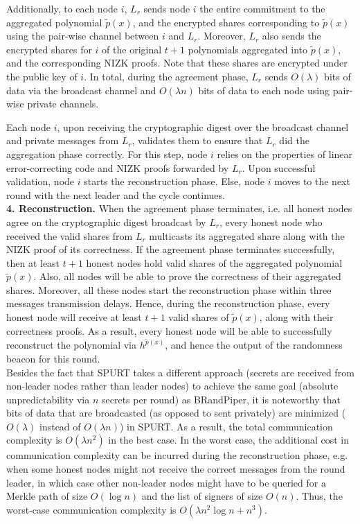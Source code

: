 \documentclass[11pt]{article}
\theoremstyle{definition}
\theoremstyle{remark}
\begin{document}
Additionally, to each node $i$, $L_r$ sends node $i$ the entire commitment to the aggregated polynomial $\tilde{p}(x)$, and the encrypted shares corresponding to $\tilde{p}(x)$ using the pair-wise channel between $i$ and $L_r$. Moreover, $L_r$ also sends the encrypted shares for $i$ of the original $t + 1$ polynomials aggregated into $\tilde{p}(x)$, and the corresponding NIZK proofs. Note that these shares are encrypted under the public key of $i$. In total, during the agreement phase, $L_r$ sends $O(\lambda)$ bits of data via the broadcast channel and $O(\lambda n)$ bits of data to each node using pair-wise private channels.

Each node $i$, upon receiving the cryptographic digest over the broadcast channel and private messages from $L_r$, validates them to ensure that $L_r$ did the aggregation phase correctly. For this step, node $i$ relies on the properties of linear error-correcting code and NIZK proofs forwarded by $L_r$. Upon successful validation, node $i$ starts the reconstruction phase. Else, node $i$ moves to the next round with the next leader and the cycle continues.\\

\textbf{4. Reconstruction.} When the agreement phase terminates, i.e. all honest nodes agree on the cryptographic digest broadcast by $L_r$, every honest node who received the valid shares from $L_r$ multicasts its aggregated share along with the NIZK proof of its correctness. If the agreement phase terminates successfully, then at least $t + 1$ honest nodes hold valid shares of the aggregated polynomial $\tilde{p}(x)$. Also, all nodes will be able to prove the correctness of their aggregated shares. Moreover, all these nodes start the reconstruction phase within three messages transmission delays. Hence, during the reconstruction phase, every honest node will receive at least $t + 1$ valid shares of $\tilde{p}(x)$, along with their correctness proofs. As a result, every honest node will be able to successfully reconstruct the polynomial via $h^{\tilde{p}(x)}$, and hence the output of the randomness beacon for this round.\\

Besides the fact that SPURT takes a different approach (secrets are received from non-leader nodes rather than leader nodes) to achieve the same goal (absolute unpredictability via $n$ secrets per round) as BRandPiper, it is noteworthy that bits of data that are broadcasted (as opposed to sent privately) are minimized ($O(\lambda)$ instead of $O(\lambda n)$) in SPURT. As a result, the total communication complexity is $O(\lambda n^2)$ in the best case. In the worst case, the additional cost in communication complexity can be incurred during the reconstruction phase, e.g. when some honest nodes might not receive the correct messages from the round leader, in which case other non-leader nodes might have to be queried for a Merkle path of size $O(\log n)$ and the list of signers of size $O(n)$. Thus, the worst-case communication complexity is $O(\lambda n^2 \log n + n^3)$.
\end{document}
